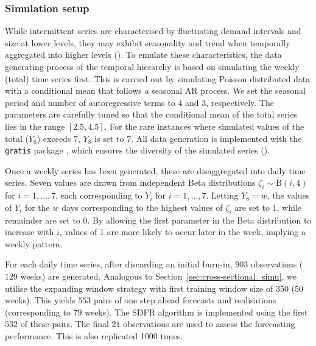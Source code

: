 \documentclass[a4paper,review,12pt,authoryear]{elsarticle}
\let\code=\texttt
\theoremstyle{definition}
\begin{document}
     \subsubsection{Simulation setup}

     While intermittent series are characterised by fluctuating demand intervals and size at lower levels, they may exhibit seasonality and trend when temporally aggregated into higher levels ().
     To emulate these characteristics, the data generating process of the temporal hierarchy is based on simulating the weekly (total) time series first. This is carried out by simulating Poisson distributed data with a conditional mean that follows a seasonal AR process. We set the seasonal period and number of autoregressive terms to $4$ and $3$, respectively. The parameters are carefully tuned so that the conditional mean of the total series lies in the range $[2.5, 4.5]$. For the rare instances where simulated values of the total ($Y_8$) exceeds $7$, $Y_8$ is set to $7$. All data generation is implemented with the \code{gratis} package \citep{gratis}, which ensures the diversity of the simulated series ().
     
     Once a weekly series has been generated, these are disaggregated into daily time series. 
     Seven values are drawn from independent Beta distributions $\zeta_i\sim\textrm{B}(i, 4)$ for $i=1,\dots,7$, each corresponding to $Y_i$ for $i=1,\dots,7$.
     Letting $Y_8=w$, the values of $Y_i$ for the $w$ days corresponding to the highest values of $\zeta_i$ are set to $1$, while remainder are set to $0$. By allowing the first parameter in the Beta distribution to increase with $i$, values of 1 are more likely to occur later in the week, implying a weekly pattern.

     For each daily time series, after discarding an initial burn-in, $903$ observations ($129$ weeks) are generated. Analogous to Section~\ref{sec:cross-sectional_simu}, we utilise the expanding window strategy with first training window size of $350$ (50 weeks). This yields $553$ pairs of one step ahead forecasts and realisations (corresponding to 79 weeks). The SDFR algorithm is implemented using the first $532$ of these pairs. The final $21$ observations are used to assess the forecasting performance. This is also replicated 1000 times.
\end{document}
